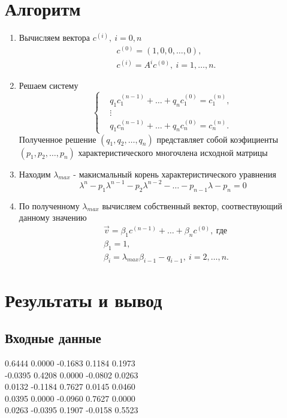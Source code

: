 \documentclass[11.4pt]{article}
\begin{document}
\section{Алгоритм}
	\begin{enumerate}
		\item Вычисляем вектора $c^{(i)}, \: i =0, n$
			\begin{equation*}
				\begin{aligned}
					&c^{(0)} = (1, 0, 0, \ldots, 0),\\
					&c^{(i)} = A^ic^{(0)}, \: i=1,\ldots,n.
				\end{aligned}
			\end{equation*}
		\item Решаем систему
			\begin{equation*}
				\left\lbrace
				\begin{aligned}
					&q_1c^{(n-1)}_1+\ldots+q_nc^{(0)}_1 = c^{(n)}_1, \\
					&\vdots \\
					&q_1c^{(n-1)}_n+\ldots+q_nc^{(0)}_n = c^{(n)}_n.
				\end{aligned}
				\right.
			\end{equation*}
			Полученное решение $(q_1, q_2, \ldots, q_n)$ представляет собой коэфициенты $(p_1, p_2,\ldots, p_n)$ характеристического многочлена исходной матрицы
			\item Находим $\lambda_{max}$ - макисмальный корень характеристического уравнения \[\lambda^n - p_1\lambda^{n-1} - p_2\lambda^{n-2}-\ldots-p_{n-1}\lambda - p_n = 0\]
			\item По полученному $\lambda_{max}$ вычисляем собственный вектор, соотвествующий данному значению \[\]
			\begin{equation*}
					\begin{aligned}
					&\vec{v} = \beta_1c^{(n-1)}+\ldots+\beta_nc^{(0)}, \: \text{где}\\
					&\beta_1 = 1,\\
					&\beta_i = \lambda_{max}\beta_{i-1} - q_{i-1}, \: i=2,\ldots,n.
					\end{aligned}
			\end{equation*}
	\end{enumerate}
\section{Результаты и вывод}
	\subsection{Входные данные}
		0.6444 0.0000 -0.1683 0.1184 0.1973\\
		-0.0395 0.4208 0.0000 -0.0802 0.0263\\
		0.0132 -0.1184 0.7627 0.0145 0.0460\\
		0.0395 0.0000 -0.0960 0.7627 0.0000\\
		0.0263 -0.0395 0.1907 -0.0158 0.5523\\
\end{document}

